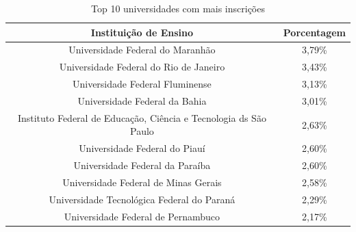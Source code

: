                 \begin{table}[]
                    \centering
                    \begin{tabular}{cc}
                    \hline
                    \textbf{Instituição de Ensino}                                   & \textbf{Porcentagem} \\ \hline
                    Universidade Federal do Maranhão                                 & 3,79\%               \\ \hline
                    Universidade Federal do Rio de Janeiro                           & 3,43\%               \\ \hline
                    Universidade Federal Fluminense                                  & 3,13\%               \\ \hline
                    Universidade Federal da Bahia                                    & 3,01\%               \\ \hline
                    Instituto Federal de Educação, Ciência e Tecnologia ds São Paulo & 2,63\%               \\ \hline
                    Universidade Federal do Piauí                                    & 2,60\%               \\ \hline
                    Universidade Federal da Paraíba                                  & 2,60\%               \\ \hline
                    Universidade Federal de Minas Gerais                             & 2,58\%               \\ \hline
                    Universidade Tecnológica Federal do Paraná                       & 2,29\%               \\ \hline
                    Universidade Federal de Pernambuco                               & 2,17\%               \\ \hline
                    \end{tabular}
                    \caption{Top 10 universidades com mais inscrições}
                    \label{tab:universidade-inscricao}
                    \end{table}

